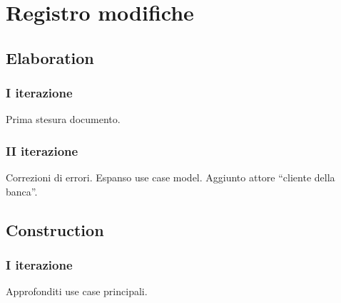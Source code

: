 \documentclass[10pt]{softeng} %
\begin{document}
\startofdocument{}











% 

\section{Registro modifiche}

\subsection{Elaboration}

\subsubsection{I iterazione}

Prima stesura documento.

\subsubsection{II iterazione}

Correzioni di errori.
Espanso use case model.
Aggiunto attore ``cliente della banca''.

\subsection{Construction}

\subsubsection{I iterazione}

Approfonditi use case principali.


\printcustombib{}

\end{document}

